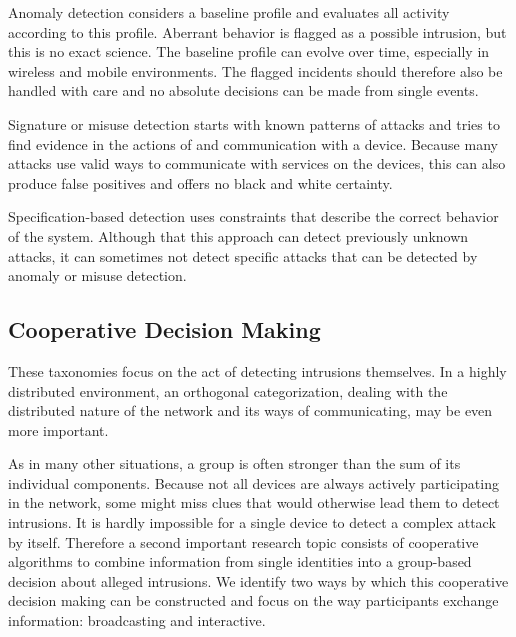 \documentclass[conference]{IEEEtran}
\begin{document}
\begin{LaTeXdescription}
  
  \item[Anomaly detection] considers a baseline profile and evaluates all
  activity according to this profile. Aberrant behavior is flagged as a
  possible intrusion, but this is no exact science. The baseline profile can
  evolve over time, especially in wireless and mobile environments. The flagged
  incidents should therefore also be handled with care and no absolute
  decisions can be made from single events.
  
  \item[Signature or misuse detection] starts with known patterns of attacks
  and tries to find evidence in the actions of and communication with a device.
  Because many attacks use valid ways to communicate with services on the
  devices, this can also produce false positives and offers no black and white
  certainty.
  
  \item[Specification-based detection] uses constraints that describe the
  correct behavior of the system. Although that this approach can detect
  previously unknown attacks, it can sometimes not detect specific attacks that
  can be detected by anomaly or misuse detection.
  
\end{LaTeXdescription}

\subsection*{Cooperative Decision Making}
\label{coorperative}

These taxonomies focus on the act of detecting intrusions themselves. In a
highly distributed environment, an orthogonal categorization, dealing with the
distributed nature of the network and its ways of communicating, may be even
more important.

As in many other situations, a group is often stronger than the sum of its
individual components. Because not all devices are always actively
participating in the network, some might miss clues that would otherwise lead
them to detect intrusions. It is hardly impossible for a single device to
detect a complex attack by itself. Therefore a second important research topic
consists of cooperative algorithms to combine information from single
identities into a group-based decision about alleged
intrusions\cite{zhang2000intrusion}. We identify two ways by which this
cooperative decision making can be constructed and focus on the way
participants exchange information: broadcasting and interactive.
\end{document}
